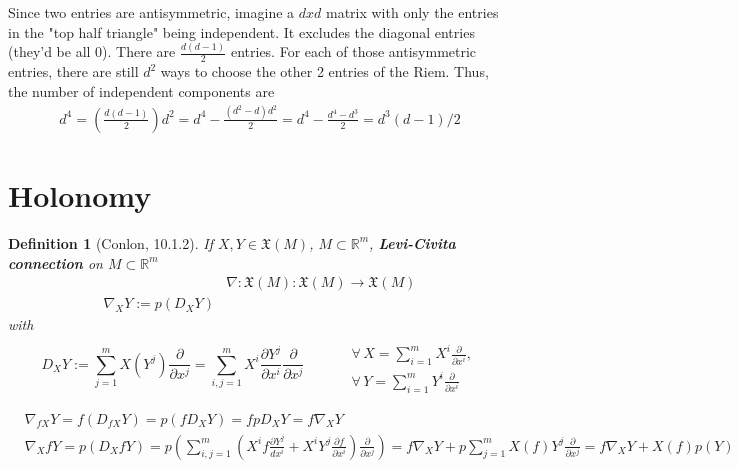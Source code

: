 \documentclass[10pt]{amsart}
\newtheorem{definition}{Definition}
\begin{document}
\begin{multicols*}{2}
Since two entries are antisymmetric, imagine a $dxd$ matrix with only the entries in the "top half triangle" being independent. It excludes the diagonal entries (they'd be all 0). There are $\frac{d(d-1)}{2}$ entries. For each of those antisymmetric entries, there are still $d^2$ ways to choose the other 2 entries of the Riem. Thus, the number of independent components are
\[
\begin{gathered}
	d^4 = \left( \frac{d(d-1)}{2} \right) d^2 = d^4 - \frac{ (d^2 - d)d^2}{2} = d^4 - \frac{d^4- d^3}{2} = d^3(d-1)/2
\end{gathered}
\]

\part{Holonomy}

\begin{definition}[Conlon, 10.1.2] If $X,Y\in \mathfrak{X}(M)$, $M\subset \mathbb{R}^m$, \textbf{Levi-Civita connection} on $M\subset \mathbb{R}^m$
	\begin{equation}
	\begin{aligned}
	& \nabla : \mathfrak{X}(M) : \mathfrak{X}(M) \to \mathfrak{X}(M) \\
	\nabla_XY := p(D_XY)
	\end{aligned}
	\end{equation}
	with 
	\[
	D_XY := \sum_{j=1}^m X(Y^j) \frac{ \partial }{ \partial x^j} = \sum_{i,j=1}^m X^i \frac{ \partial Y^j}{ \partial x^i} \frac{ \partial }{ \partial x^j} \qquad \,  \begin{aligned} & \quad \\ 
		& \forall \, X=\sum_{i=1}^m X^i \frac{ \partial }{ \partial x^i},  \\
		& \forall \, Y=\sum_{i=1}^m Y^i \frac{\partial }{ \partial x^i } \end{aligned}
	\]
\end{definition}

\[
\begin{aligned}
	& \nabla_{fX}Y = f(D_{fX}Y) = p(fD_XY) = fpD_XY = f\nabla_XY \\ 
	&  \nabla_X fY = p(D_XfY) = p \left( \sum_{i,j=1}^m \left( X^i f\frac{ \partial Y^j}{ dx^i } + X^i Y^j \frac{ \partial f}{ \partial x^i} \right) \frac{ \partial }{ \partial x^j} \right) = f\nabla_X Y + p \sum_{j=1}^m X(f) Y^j \frac{ \partial }{ \partial x^j} = f\nabla_XY + X(f) p(Y)
\end{aligned}
\]



\end{multicols*}
\end{document}
